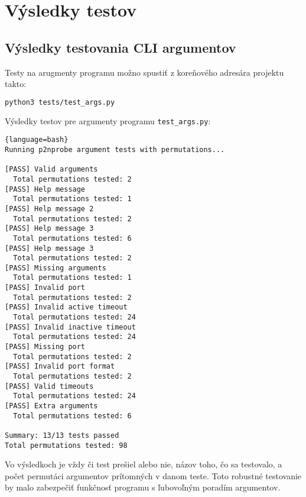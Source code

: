 \documentclass[a4paper, 12pt]{article}
\begin{document}
\newpage

\section{Výsledky testov}

\subsection{Výsledky testovania CLI argumentov}

Testy na arugmenty programu možno spustiť z koreňového adresára projektu takto:
\begin{lstlisting}[language=bash]
    python3 tests/test_args.py
\end{lstlisting}


Výsledky testov pre argumenty programu \texttt{test\_args.py}:

\begin{lstlisting}{language=bash}
Running p2nprobe argument tests with permutations...

[PASS] Valid arguments
  Total permutations tested: 2
[PASS] Help message
  Total permutations tested: 1
[PASS] Help message 2
  Total permutations tested: 2
[PASS] Help message 3
  Total permutations tested: 6
[PASS] Help message 3
  Total permutations tested: 2
[PASS] Missing arguments
  Total permutations tested: 1
[PASS] Invalid port
  Total permutations tested: 2
[PASS] Invalid active timeout
  Total permutations tested: 24
[PASS] Invalid inactive timeout
  Total permutations tested: 24
[PASS] Missing port
  Total permutations tested: 2
[PASS] Invalid port format
  Total permutations tested: 2
[PASS] Valid timeouts
  Total permutations tested: 24
[PASS] Extra arguments
  Total permutations tested: 6

Summary: 13/13 tests passed
Total permutations tested: 98
\end{lstlisting}
Vo výsledkoch je vždy či test prešiel alebo nie, názov toho, čo sa testovalo, a počet permutáci argumentov prítomných v danom teste.
Toto robustné testovanie by malo zabezpečiť funkčnosť programu s ľubovoľným poradím argumentov.

\newpage
\end{document}
